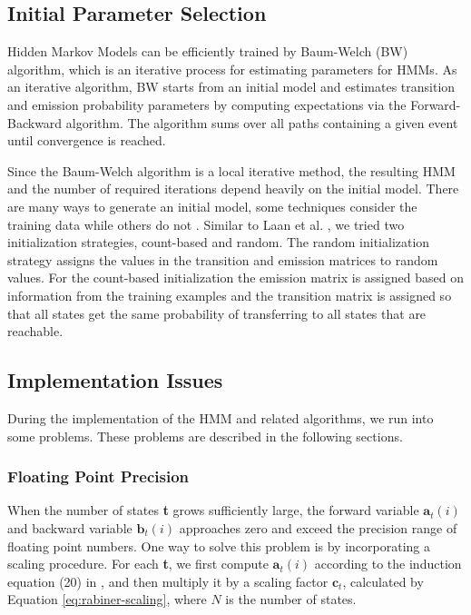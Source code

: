 \subsection{Initial Parameter Selection}

Hidden Markov Models can be efficiently trained by Baum-Welch (BW) algorithm, which is an iterative process for estimating parameters for HMMs. 
As an iterative algorithm, BW starts from an initial model and estimates transition and emission probability parameters by computing expectations via the Forward-Backward algorithm.
The algorithm sums over all paths containing a given event until convergence is reached.

Since the Baum-Welch algorithm is a local iterative method, the resulting HMM and the number of required iterations depend heavily on the initial model. 
There are many ways to generate an initial model, some techniques consider the training data while others do not \cite{Laan}.
Similar to Laan et al. \cite{Laan}, we tried two initialization strategies, count-based and random.
The random initialization strategy assigns the values in the transition and emission matrices to random values.
For the count-based initialization the emission matrix is assigned based on information from the training examples and the transition matrix is assigned so that all states get the same probability of transferring to all states that are reachable.

\subsection{Implementation Issues}

During the implementation of the HMM and related algorithms, we run into some problems. These problems are described in the following sections.

\subsubsection{Floating Point Precision}

When the number of states \textbf{t} grows sufficiently large, the forward variable $\textbf{a}_t(i)$ and backward variable  $\textbf{b}_t(i)$ approaches zero and exceed the precision range of floating point numbers.
One way to solve this problem is by incorporating a scaling procedure.
For each \textbf{t}, we first compute $\textbf{a}_t(i)$ according to the induction equation (20) in  \cite{Rabiner1989}, and then multiply it by a scaling factor  $\textbf{c}_t$, calculated by Equation \ref{eq:rabiner-scaling}, where $N$ is the number of states.

